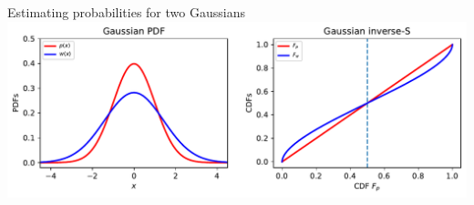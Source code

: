 \begin{frame}{Estimating probabilities for two Gaussians}
\centering
	\includegraphics[width=\textwidth]{../../figs/square_root_error_2Gaussians.pdf} \\

\end{frame}

%
%
%
%
%

